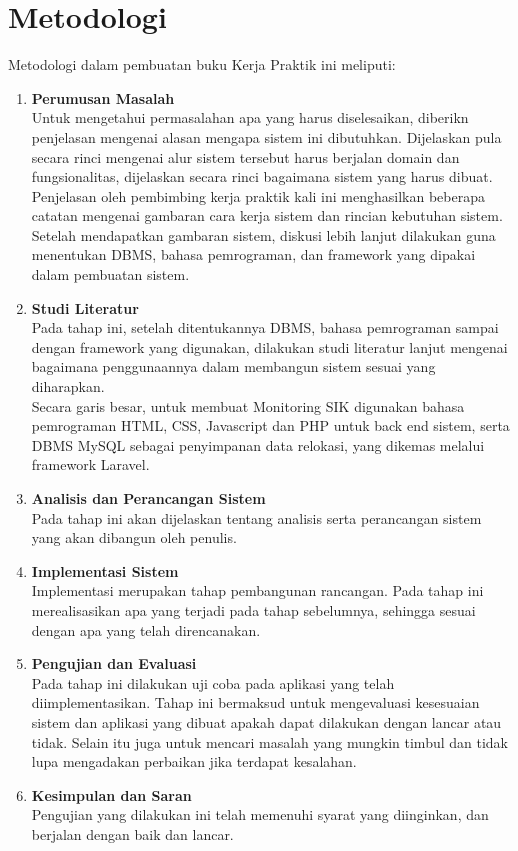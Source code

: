 \section{Metodologi}
\tab Metodologi dalam pembuatan buku Kerja Praktik ini meliputi:
\begin{enumerate}
	\item \textbf{Perumusan Masalah}\\
	\tab Untuk mengetahui permasalahan apa yang harus diselesaikan, diberikn penjelasan mengenai alasan mengapa sistem ini dibutuhkan. Dijelaskan pula secara rinci mengenai alur sistem tersebut harus berjalan domain dan fungsionalitas, dijelaskan secara rinci bagaimana sistem yang harus dibuat. Penjelasan oleh pembimbing kerja praktik kali ini menghasilkan beberapa catatan mengenai gambaran cara kerja sistem dan rincian kebutuhan sistem. Setelah mendapatkan gambaran sistem, diskusi lebih lanjut dilakukan guna menentukan DBMS, bahasa pemrograman, dan framework yang dipakai dalam pembuatan sistem.\\
	\item \textbf{Studi Literatur}\\
	\tab Pada tahap ini, setelah ditentukannya DBMS, bahasa pemrograman sampai dengan framework yang digunakan, dilakukan studi literatur lanjut mengenai bagaimana penggunaannya dalam membangun sistem sesuai yang diharapkan.\\
	\tab Secara garis besar, untuk membuat Monitoring SIK digunakan bahasa pemrograman HTML, CSS, Javascript dan PHP untuk back end sistem, serta DBMS MySQL sebagai penyimpanan data relokasi, yang dikemas	melalui framework Laravel.\\
	\item \textbf{Analisis dan Perancangan Sistem}\\
	\tab Pada tahap ini akan dijelaskan tentang analisis serta perancangan sistem yang akan dibangun oleh penulis.\\
	\item \textbf{Implementasi Sistem}\\
	\tab Implementasi merupakan tahap pembangunan rancangan. Pada tahap ini merealisasikan apa yang terjadi pada tahap sebelumnya, sehingga sesuai dengan apa yang telah direncanakan.\\
	\item \textbf{Pengujian dan Evaluasi}\\
	\tab Pada tahap ini dilakukan uji coba pada aplikasi yang telah diimplementasikan. Tahap ini bermaksud untuk mengevaluasi kesesuaian sistem dan aplikasi yang dibuat apakah dapat dilakukan dengan lancar atau tidak. Selain itu juga untuk mencari masalah yang mungkin timbul dan tidak lupa mengadakan perbaikan jika terdapat kesalahan.\\
	\item \textbf{Kesimpulan dan Saran}\\
	\tab Pengujian yang dilakukan ini telah memenuhi syarat yang diinginkan, dan berjalan dengan baik dan lancar.
\end{enumerate}

